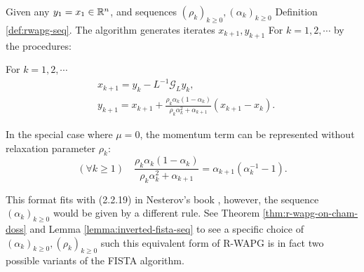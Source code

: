 \documentclass[12pt]{article}
\begin{document}
        \begin{definition}\label{def:r-wapg-momentum-form}
            Given any $y_1 = x_1 \in \mathbb R^n$, and sequences $(\rho_k)_{k \ge 0}, (\alpha_k)_{k\ge 0}$ Definition \ref{def:rwapg-seq}. 
            The algorithm generates iterates $x_{k + 1}, y_{k + 1}$ For $k = 1, 2, \cdots $ by the procedures: 
            \begin{tcolorbox}
                For $k=1, 2,\cdots $
                \begin{align*}
                    & x_{k + 1} = y_k - L^{-1}\mathcal G_Ly_k, 
                    \\
                    & 
                    y_{k + 1} = 
                    x_{k + 1} + 
                    \frac{\rho_k\alpha_k(1 - \alpha_k)}{\rho_k\alpha_k^2 + \alpha_{k + 1}}(x_{k + 1} - x_k). 
                \end{align*}    
            \end{tcolorbox}
            In the special case where $\mu = 0$, the momentum term can be represented without relaxation parameter $\rho_k$: 
            $$
                (\forall k \ge 1)\quad \frac{\rho_k\alpha_k(1 - \alpha_k)}{\rho_k\alpha_k^2 + \alpha_{k + 1}} 
                = \alpha_{k + 1}(\alpha_k^{-1} - 1). 
            $$
        \end{definition}
        \begin{remark}
            This format fits with (2.2.19) in Nesterov's book \cite{nesterov_lectures_2018}, however, the sequence $(\alpha_k)_{k \ge 0}$ would be given by a different rule. 
            See Theorem \ref{thm:r-wapg-on-cham-doss} and Lemma \ref{lemma:inverted-fista-seq} to see a specific choice of $(\alpha_k)_{k \ge0}, (\rho_k)_{ k\ge 0}$ such this equivalent form of R-WAPG is in fact two possible variants of the FISTA algorithm.
        \end{remark}
\end{document}
